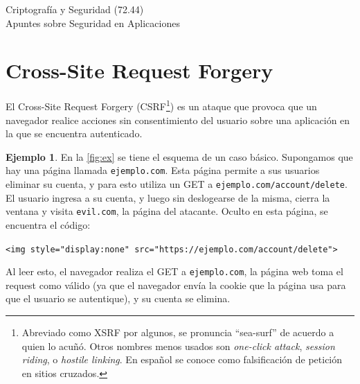 \documentclass{article}
\theoremstyle{definition}
\newtheorem{ex}{Ejemplo}
\begin{document}
\begin{center}
\Large Criptografía y Seguridad (72.44)\\[.05cm]
Apuntes sobre Seguridad en Aplicaciones\\[.05cm]
\the\year
\end{center}

\vspace{0.2 cm}
\section{Cross-Site Request Forgery}
El Cross-Site Request Forgery (CSRF\footnote{Abreviado como XSRF por algunos, se
  pronuncia ``sea-surf'' de acuerdo a quien lo acuñó. Otros nombres menos usados
  son \textit{one-click attack}, \textit{session riding}, o \textit{hostile
linking}. En español se conoce como falsificación de petición en sitios
cruzados.}) es un ataque que provoca que un navegador realice acciones sin
consentimiento del usuario sobre una aplicación en la que se encuentra
autenticado.

\begin{ex}\label{ex:1}
  En la \autoref{fig:ex} se tiene el esquema de un caso básico. Supongamos que
  hay una página llamada \verb+ejemplo.com+. Esta página
  permite a sus usuarios eliminar su cuenta, y para esto utiliza un GET a
  \verb+ejemplo.com/account/delete+. El usuario ingresa a su cuenta, y luego sin
  deslogearse de la misma, cierra la ventana y visita \verb+evil.com+, la página
  del atacante. Oculto en esta página, se encuentra el código: 

  \begin{center}
\verb+<img style="display:none" src="https://ejemplo.com/account/delete">+
  \end{center}

 Al leer  esto, el navegador realiza el GET a \verb+ejemplo.com+, la página web
 toma el request como válido (ya que el navegador envía la cookie que la página
 usa para que el usuario se autentique), y su cuenta se elimina.
\end{ex}
\end{document}
